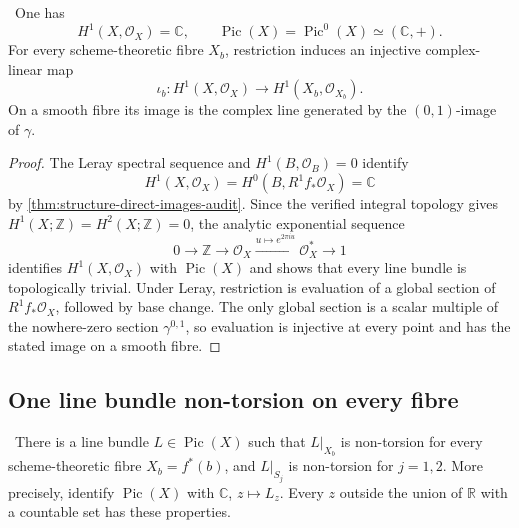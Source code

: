 \begin{corollary}
\label{cor:picard-line-audit}
\Verified\ One has
\[
 H^1(X,\mathcal O_X)=\mathbb C,\qquad
 \operatorname{Pic}(X)=\operatorname{Pic}^0(X)\simeq(\mathbb C,+).
\tag{9.17}
\]
For every scheme-theoretic fibre \(X_b\), restriction induces an injective
complex-linear map
\[
 \iota_b:H^1(X,\mathcal O_X)\longrightarrow
 H^1(X_b,\mathcal O_{X_b}).
\tag{9.18}
\]
On a smooth fibre its image is the complex line generated by the
\((0,1)\)-image of \(\gamma\).
\end{corollary}

\begin{proof}
The Leray spectral sequence and \(H^1(B,\mathcal O_B)=0\) identify
\[
 H^1(X,\mathcal O_X)=H^0(B,R^1f_*\mathcal O_X)=\mathbb C
\]
by \cref{thm:structure-direct-images-audit}.  Since the verified integral
topology gives \(H^1(X;\mathbb Z)=H^2(X;\mathbb Z)=0\), the analytic
exponential sequence
\[
0\to\mathbb Z\to\mathcal O_X
 \xrightarrow{u\mapsto e^{2\pi iu}}\mathcal O_X^*\to1
\]
identifies \(H^1(X,\mathcal O_X)\) with \(\operatorname{Pic}(X)\) and
shows that every line bundle is topologically trivial.  Under Leray,
restriction is evaluation of a global section of
\(R^1f_*\mathcal O_X\), followed by base change.  The only global section
is a scalar multiple of the nowhere-zero section \(\gamma^{0,1}\), so
evaluation is injective at every point and has the stated image on a
smooth fibre.
\end{proof}

\subsection{One line bundle non-torsion on every fibre}

\begin{theorem}
\label{thm:uniform-nontorsion-audit}
\Verified\ There is a line bundle \(L\in\operatorname{Pic}(X)\) such that
\(L|_{X_b}\) is non-torsion for every scheme-theoretic fibre
\(X_b=f^*(b)\), and \(L|_{S_j}\) is non-torsion for \(j=1,2\).
More precisely, identify \(\operatorname{Pic}(X)\) with \(\mathbb C\),
\(z\mapsto L_z\).  Every \(z\) outside the union of \(\mathbb R\) with a
countable set has these properties.
\end{theorem}

